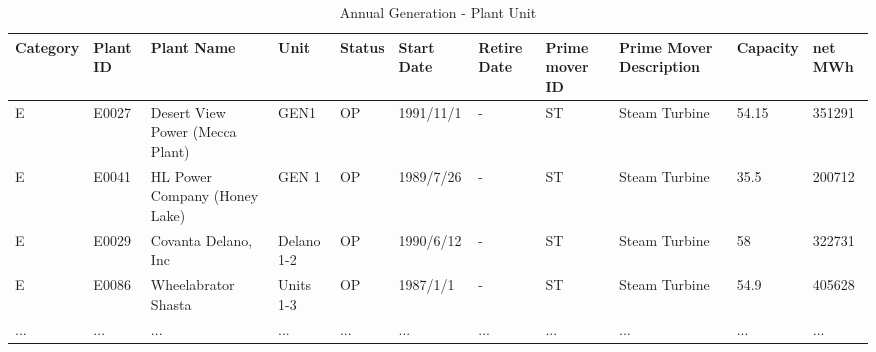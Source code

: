 \begin{table*}[p!]
	\setlength\extrarowheight{2pt} %
	\begin{tabular}{ |l|p{1cm}|p{2cm}|p{1cm}|l|p{2cm}|p{1cm}|p{2cm}|p{2cm}|p{1cm}|p{1cm}|  }
		\hline
		Category& 	Plant ID& 	Plant Name& 	Unit& 	Status& 	Start Date& 	Retire Date& 	Prime mover ID& Prime Mover Description& Capacity& net MWh\\
		\hline
		 E& E0027& 	Desert View Power (Mecca Plant)& 	GEN1& 	OP& 	1991/11/1& 	-	&ST& 	Steam Turbine& 	54.15& 	351291\\
		 \hline
		 E & 	E0041& 	HL Power Company (Honey Lake)& 	GEN 1& 	OP& 	1989/7/26& 	-	&ST& 	Steam Turbine& 	35.5& 	200712\\
		 \hline
		 E& E0029& 	Covanta Delano, Inc& 	Delano 1-2& 	OP& 	1990/6/12& 	- &ST& 	Steam Turbine& 	58& 	322731\\
		 \hline
		 E& 	E0086& 	Wheelabrator Shasta& 	Units 1-3& 	OP& 	1987/1/1& 	-	&ST& 	Steam Turbine& 	54.9& 	405628\\
		 \hline
		 ... & ... & ... & ... & ... & ... & ... & ... & ... & ... & ... \\
		 
		\hline
		
		
	\end{tabular}
	\vspace{.2cm}
	\caption{Annual Generation - Plant Unit\label{tab:q1-result2}}
\end{table*}

